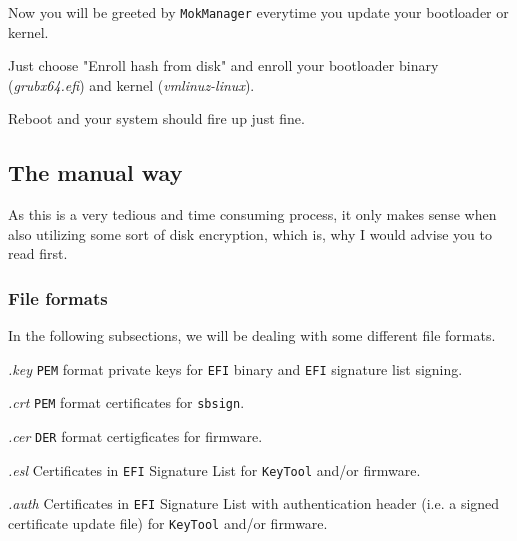 \documentclass[10pt]{dustdoc}
\begin{document}
Now you will be greeted by \texttt{MokManager} everytime you update your bootloader or kernel.

Just choose "Enroll hash from disk" and enroll your bootloader binary (\textit{grubx64.efi}) and kernel (\textit{vmlinuz-linux}).

Reboot and your system should fire up just fine.

\subsection{The manual way}
\label{sec:the-manual-way}

\begin{WARNING}
    As this is a very tedious and time consuming process, it only makes sense when also utilizing some sort of disk encryption, which is, why I would advise you to read  first.
\end{WARNING}

\subsubsection{File formats}
\label{sec:file-formats}

In the following subsections, we will be dealing with some different file formats.

\begin{sidebar}{\textit{.key}}
    \texttt{PEM} format private keys for \texttt{EFI} binary and \texttt{EFI} signature list signing.
\end{sidebar}

\begin{sidebar}{\textit{.crt}}
    \texttt{PEM} format certificates for \texttt{sbsign}.
\end{sidebar}

\begin{sidebar}{\textit{.cer}}
    \texttt{DER} format certigficates for firmware.
\end{sidebar}

\begin{sidebar}{\textit{.esl}}
    Certificates in \texttt{EFI} Signature List for \texttt{KeyTool} and/or firmware.
\end{sidebar}

\begin{sidebar}{\textit{.auth}}
    Certificates in \texttt{EFI} Signature List with authentication header (i.e. a signed certificate update file) for \texttt{KeyTool} and/or firmware.
\end{sidebar}
\end{document}
